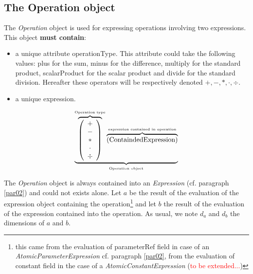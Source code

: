 \documentclass[11pt]{amsart}
\begin{document}

\subsection{The Operation object}\label{par02_02}
The {\it Operation} object is used for expressing operations involving two expressions. This object {\bf must contain}:
\begin{itemize}
\item a unique attribute operationType. This attribute could take the following values: plus for the sum, minus for the difference, multiply for the standard product, scalarProduct for the scalar product and divide for the standard division. Hereafter these operators will be respectively denoted $+,-,\ast,\cdot, \div$. 
\item a unique expression.
\end{itemize}
\begin{equation}\label{OperationEquation}
\underbrace{ \overbrace{\left( \begin{array}{c} + \\ - \\ \ast  \\ \cdot \\ \div   \end{array} \right) }^{\mbox{\tiny Operation type}}
 \overbrace{    \left( \mbox{ContaindedExpression}\right) }^{\mbox{\tiny expression contained in operation}}   }_{\mbox{\tiny Operation object}}
\end{equation}

The {\it Operation} object is always contained into an {\it Expression} (cf. paragraph \ref{par02}) and could not exists alone.
Let $a$ be the result of the evaluation of the expression object containing the operation\footnote{this came from the evaluation of parameterRef field in case of an {\it AtomicParameterExpression} cf. paragraph \ref{par02}, from the evaluation of constant field in the case of a {\it AtomicConstantExpression} (\textcolor{red}{to be extended...})} and let $b$ the result of the evaluation of the expression contained into the operation. As usual, we note $d_a$ and $d_b$ the dimensions of $a$ and $b$.\\
\end{document}
